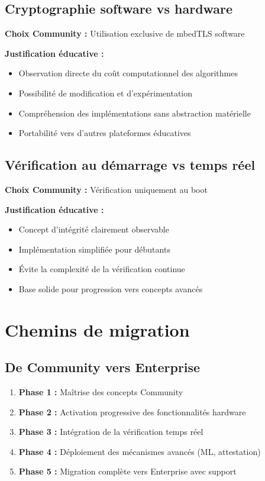 \subsection{Cryptographie software vs hardware}

\textbf{Choix Community :} Utilisation exclusive de mbedTLS software

\textbf{Justification éducative :}
\begin{itemize}
    \item Observation directe du coût computationnel des algorithmes
    \item Possibilité de modification et d'expérimentation
    \item Compréhension des implémentations sans abstraction matérielle
    \item Portabilité vers d'autres plateformes éducatives
\end{itemize}

\subsection{Vérification au démarrage vs temps réel}

\textbf{Choix Community :} Vérification uniquement au boot

\textbf{Justification éducative :}
\begin{itemize}
    \item Concept d'intégrité clairement observable
    \item Implémentation simplifiée pour débutants
    \item Évite la complexité de la vérification continue
    \item Base solide pour progression vers concepts avancés
\end{itemize}

\section{Chemins de migration}

\subsection{De Community vers Enterprise}

\begin{enumerate}
    \item \textbf{Phase 1 :} Maîtrise des concepts Community
    \item \textbf{Phase 2 :} Activation progressive des fonctionnalités hardware
    \item \textbf{Phase 3 :} Intégration de la vérification temps réel
    \item \textbf{Phase 4 :} Déploiement des mécanismes avancés (ML, attestation)
    \item \textbf{Phase 5 :} Migration complète vers Enterprise avec support
\end{enumerate}

